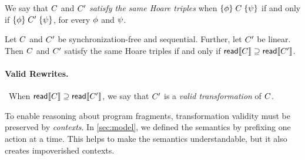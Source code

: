 We say that $C$ and $C'$ \emph{satisfy the same Hoare triples} when
$\{\phi\}\allowbreak\;C\;\allowbreak\{\psi\}$ if and only if
$\{\phi\}\allowbreak\;C'\;\allowbreak\{\psi\}$, for every $\phi$ and $\psi$.

\begin{corollary}\label{seqcompleteness}
  Let $C$ and $C'$ be synchronization-free and sequential.  Further,
  let $C'$ be linear.
  Then $C$ and $C'$ satisfy the same Hoare
  triples if and only if $\mathsf{read}\llbracket C\rrbracket \supseteq \mathsf{read}\llbracket C'\rrbracket$.
%    
\end{corollary}

\paragraph{Valid Rewrites.}
\ When ${\mathsf{read}}\llbracket C\rrbracket \supseteq {\mathsf{read}}\llbracket C'\rrbracket$, we say that $C'$ is
a \emph{valid transformation} of $C$.

To enable reasoning about program fragments, transformation validity must be
preserved by \emph{contexts}.  In \textsection\ref{sec:model}, we defined the
semantics by prefixing one action at a time.  This helps to make the
semantics understandable, but it also creates impoverished contexts.

